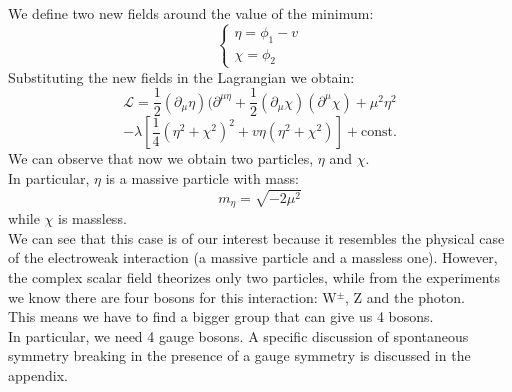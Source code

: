 We define two new fields around the value of the minimum:
\begin{equation}
    \begin{cases}
        \eta = \phi_1 - v\\
        \chi = \phi_2
    \end{cases}
\end{equation}
Substituting the new fields in the Lagrangian we obtain:
\begin{equation}
    \mathcal{L} = \frac{1}{2}(\partial_{\mu}\eta)(\partial^{\mu\eta} + \frac{1}{2}(\partial_{\mu}\chi)(\partial^{\mu}\chi) +\mu^2 \eta^2 
\end{equation}
\begin{equation*}
    - \lambda\left[\frac{1}{4}\left(\eta^2 +\chi^2\right)^2 + v \eta \left(\eta^2 + \chi^2\right)\right] +\text{const.}
\end{equation*}
We can observe that now we obtain two particles, $\eta$ and $\chi$.\\
In particular, $\eta$ is a massive particle with mass:
\begin{equation*}
    m_{\eta} = \sqrt{-2\mu^2}
\end{equation*}
while $\chi$ is massless.\\

We can see that this case is of our interest because it resembles the physical case of the electroweak interaction (a massive particle and a massless one).
However, the complex scalar field theorizes only two particles, while from the experiments we know there are four bosons for this interaction: W$^{\pm}$, Z and the photon.\\This means we have to find a bigger group that can give us 4 bosons. \\
In particular, we need 4 gauge bosons. A specific discussion of spontaneous symmetry breaking in the presence of a gauge symmetry is discussed in the appendix.

